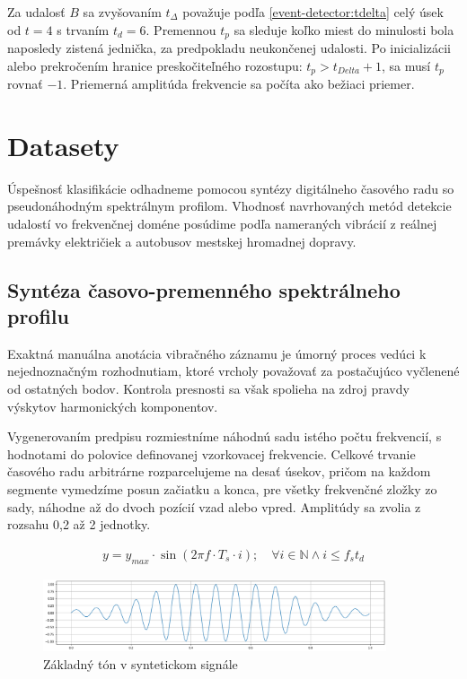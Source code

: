 Za udalosť $B$ sa zvyšovaním $t_{\Delta}$ považuje podľa \ref{event-detector:tdelta} celý úsek od $t = 4$ s trvaním $t_d = 6$.
Premennou $t_p$ sa sleduje koľko miest do minulosti bola naposledy
zistená jednička, za predpokladu neukončenej udalosti. Po inicializácii alebo prekročením hranice preskočiteľného
rozostupu: $t_p > t_{Delta} + 1$, sa musí $t_p$ rovnať $-1$. Priemerná amplitúda frekvencie sa počíta ako bežiaci priemer.

\section{Datasety}
Úspešnosť klasifikácie odhadneme pomocou syntézy digitálneho časového radu so pseudonáhodným spektrálnym profilom.
Vhodnosť navrhovaných metód detekcie udalostí vo frekvenčnej doméne posúdime podľa nameraných vibrácií z reálnej
premávky električiek a autobusov mestskej hromadnej dopravy.

\subsection{Syntéza časovo-premenného spektrálneho profilu}
Exaktná manuálna anotácia vibračného záznamu je úmorný proces vedúci k nejednoznačným rozhodnutiam, ktoré vrcholy považovať
za postačujúco vyčlenené od ostatných bodov. Kontrola presnosti sa však spolieha na zdroj pravdy výskytov harmonických
komponentov.

Vygenerovaním predpisu rozmiestníme náhodnú sadu istého počtu frekvencií, s hodnotami do polovice
definovanej vzorkovacej frekvencie. Celkové trvanie časového radu arbitrárne rozparcelujeme na desať úsekov, pričom
na každom segmente vymedzíme posun začiatku a konca, pre všetky frekvenčné zložky zo sady, náhodne až do dvoch pozícií
vzad alebo vpred. Amplitúdy sa zvolia z rozsahu 0,2 až 2 jednotky.

\begin{ceqn}\begin{align}
y = y_{max} \cdot \sin(2\pi f \cdot T_s \cdot i); \quad \forall i \in \mathbb{N} \land i \leq f_s t_d \label{eq:sinusoid}
\end{align}\end{ceqn}

\begin{figure}[h]
   \centering
    \includegraphics[width=0.9\textwidth]{figures/verification/fade-in-sinusoid.png}
   \caption{Základný tón v syntetickom signále}
   \label{tone}
\end{figure}


